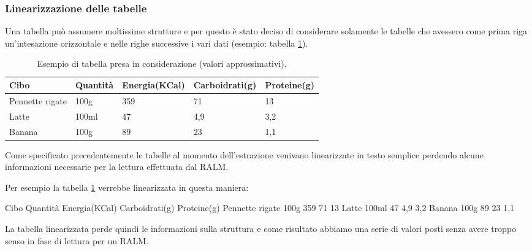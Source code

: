 \subsubsection{Linearizzazione delle tabelle}
\label{subsubsec-lin-tab}
Una tabella può assumere moltissime strutture e per questo è stato deciso di considerare solamente le tabelle che avessero come prima riga 
un'intesazione orizzontale e nelle righe successive i vari dati (esempio: tabella \ref{tab:esempio-cibo}).

\begin{table}[H]
    \centering
    \begin{tabular}{|p{3cm} |p{2cm} |p{2cm}| p{2cm}| p{2cm}|}
        \hline
        Cibo & Quantità & Energia(KCal) & Carboidrati(g) & Proteine(g) \\
        \hline
        Pennette rigate & 100g & 359 & 71 & 13 \\
        \hline
        Latte & 100ml & 47 & 4,9 & 3,2 \\
        \hline
        Banana & 100g & 89 & 23 & 1,1 \\
        \hline
    \end{tabular}
    \caption{Esempio di tabella presa in considerazione (valori approssimativi).}
    \label{tab:esempio-cibo}
\end{table}
\noindent Come specificato precedentemente le tabelle al momento dell'estrazione venivano linearizzate in testo semplice
perdendo alcune informazioni necessarie per la lettura effettuata dal RALM. 

\noindent Per esempio la tabella \ref{tab:esempio-cibo} verrebbe linearizzata in questa maniera:
\begin{tcolorbox}[colback=white, colframe=black]
    Cibo Quantità Energia(KCal) Carboidrati(g) Proteine(g) Pennette rigate  100g  359  71  13 Latte 100ml 47 4,9 3,2 Banana  100g 89 23 1,1
\end{tcolorbox}
\noindent La tabella linearizzata perde quindi le informazioni sulla struttura e come risultato abbiamo una serie di valori posti senza avere troppo senso in fase di lettura per un RALM. \\

